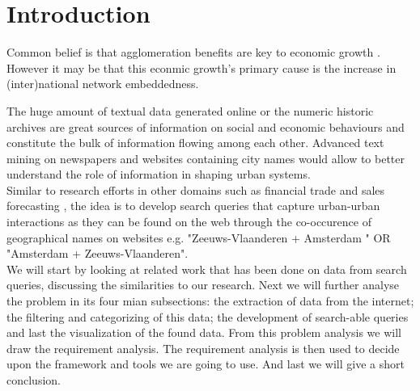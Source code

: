 \section{Introduction}


Common belief is that agglomeration benefits are key to economic growth \cite{porter2000location}. 
However it may be that this econmic growth's primary cause is the increase in (inter)national network embeddedness. 

The huge amount of textual data generated online or the numeric historic archives are great sources of information on social and economic behaviours and constitute the bulk of information flowing among each other. Advanced text mining on newspapers and websites containing city names would allow to better understand the role of information in shaping urban systems. \\
Similar to research efforts in other domains such as financial trade \cite{preis2013quantifying} and sales forecasting \cite{wu2014future}, the idea is to develop search queries that capture urban-urban interactions as they can be found on the web through the co-occurence of geographical names on websites e.g. "Zeeuws-Vlaanderen + Amsterdam " OR "Amsterdam + Zeeuws-Vlaanderen". \\

We will start by looking at related work that has been done on data from search queries, discussing the similarities to our research. Next we will further analyse the problem in its four mian subsections: the extraction of data from the internet; the filtering and categorizing of this data; the development of search-able queries and last the visualization of the found data. From this problem analysis we will draw the requirement analysis. The requirement analysis is then used to decide upon the framework and tools we are going to use. And last we will give a short conclusion.